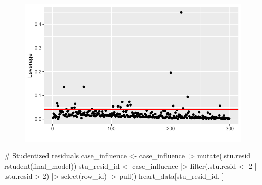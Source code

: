 \documentclass[
  letterpaper,
  DIV=11,
  numbers=noendperiod]{scrartcl}
\newenvironment{Shaded}{\begin{snugshade}}{\end{snugshade}}
\newcommand{\AttributeTok}[1]{\textcolor[rgb]{0.40,0.45,0.13}{#1}}
\newcommand{\CommentTok}[1]{\textcolor[rgb]{0.37,0.37,0.37}{#1}}
\newcommand{\DecValTok}[1]{\textcolor[rgb]{0.68,0.00,0.00}{#1}}
\newcommand{\FunctionTok}[1]{\textcolor[rgb]{0.28,0.35,0.67}{#1}}
\newcommand{\NormalTok}[1]{\textcolor[rgb]{0.00,0.23,0.31}{#1}}
\newcommand{\OtherTok}[1]{\textcolor[rgb]{0.00,0.23,0.31}{#1}}
\newcommand{\SpecialCharTok}[1]{\textcolor[rgb]{0.37,0.37,0.37}{#1}}
\begin{document}
\begin{figure}[H]

{\centering \includegraphics{SDS-291-final-project-report_files/figure-pdf/unnamed-chunk-9-1.pdf}

}

\end{figure}

\begin{Shaded}
\begin{Highlighting}[]
\CommentTok{\# Studentized residuals}
\NormalTok{case\_influence }\OtherTok{\textless{}{-}}\NormalTok{ case\_influence }\SpecialCharTok{|\textgreater{}} \FunctionTok{mutate}\NormalTok{(}\AttributeTok{.stu.resid =} \FunctionTok{rstudent}\NormalTok{(final\_model))}
\NormalTok{stu\_resid\_id }\OtherTok{\textless{}{-}}\NormalTok{ case\_influence }\SpecialCharTok{|\textgreater{}} \FunctionTok{filter}\NormalTok{(.stu.resid }\SpecialCharTok{\textless{}} \SpecialCharTok{{-}}\DecValTok{2} \SpecialCharTok{|}\NormalTok{ .stu.resid }\SpecialCharTok{\textgreater{}} \DecValTok{2}\NormalTok{) }\SpecialCharTok{|\textgreater{}} \FunctionTok{select}\NormalTok{(row\_id) }\SpecialCharTok{|\textgreater{}} \FunctionTok{pull}\NormalTok{()}
\NormalTok{heart\_data[stu\_resid\_id, ]}
\end{Highlighting}
\end{Shaded}
\end{document}
